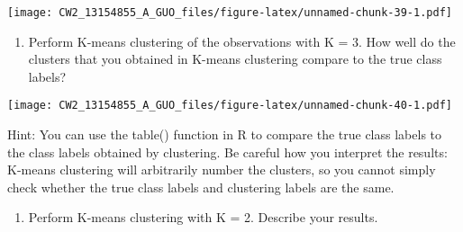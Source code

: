 \documentclass[]{article}
\newenvironment{Shaded}{\begin{snugshade}}{\end{snugshade}}
\newcommand{\KeywordTok}[1]{\textcolor[rgb]{0.13,0.29,0.53}{\textbf{#1}}}
\newcommand{\DataTypeTok}[1]{\textcolor[rgb]{0.13,0.29,0.53}{#1}}
\newcommand{\DecValTok}[1]{\textcolor[rgb]{0.00,0.00,0.81}{#1}}
\newcommand{\StringTok}[1]{\textcolor[rgb]{0.31,0.60,0.02}{#1}}
\newcommand{\CommentTok}[1]{\textcolor[rgb]{0.56,0.35,0.01}{\textit{#1}}}
\newcommand{\OperatorTok}[1]{\textcolor[rgb]{0.81,0.36,0.00}{\textbf{#1}}}
\newcommand{\NormalTok}[1]{#1}
\providecommand{\tightlist}{%
  \setlength{\itemsep}{0pt}\setlength{\parskip}{0pt}}
\begin{document}
\begin{Shaded}
\end{Shaded}

\texttt{[image: CW2\_13154855\_A\_GUO\_files/figure-latex/unnamed-chunk-39-1.pdf]}

\begin{enumerate}
\def\labelenumi{(\alph{enumi})}
\setcounter{enumi}{2}
\tightlist
\item
  Perform K-means clustering of the observations with K = 3. How well do
  the clusters that you obtained in K-means clustering compare to the
  true class labels?
\end{enumerate}

\begin{Shaded}
\end{Shaded}

\texttt{[image: CW2\_13154855\_A\_GUO\_files/figure-latex/unnamed-chunk-40-1.pdf]}

Hint: You can use the table() function in R to compare the true class
labels to the class labels obtained by clustering. Be careful how you
interpret the results: K-means clustering will arbitrarily number the
clusters, so you cannot simply check whether the true class labels and
clustering labels are the same.

\begin{enumerate}
\def\labelenumi{(\alph{enumi})}
\setcounter{enumi}{3}
\tightlist
\item
  Perform K-means clustering with K = 2. Describe your results.
\end{enumerate}
\end{document}
